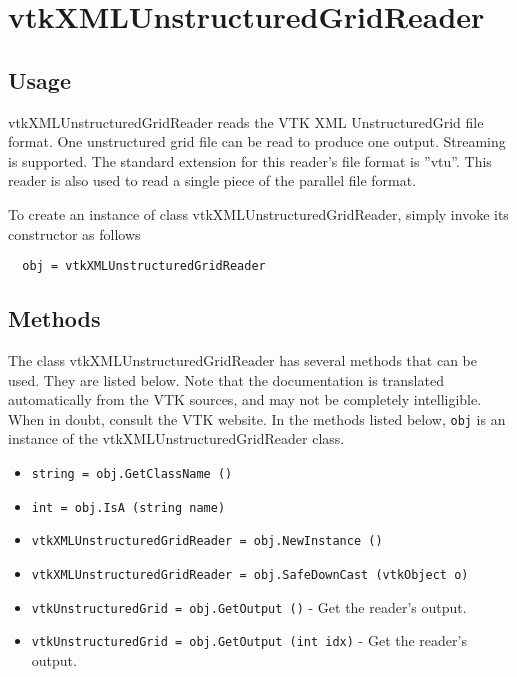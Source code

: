 \section{vtkXMLUnstructuredGridReader}

\subsection{Usage}

 vtkXMLUnstructuredGridReader reads the VTK XML UnstructuredGrid
 file format.  One unstructured grid file can be read to produce one
 output.  Streaming is supported.  The standard extension for this
 reader's file format is ''vtu''.  This reader is also used to read a
 single piece of the parallel file format.

To create an instance of class vtkXMLUnstructuredGridReader, simply
invoke its constructor as follows
\begin{verbatim}
  obj = vtkXMLUnstructuredGridReader
\end{verbatim}
\subsection{Methods}

The class vtkXMLUnstructuredGridReader has several methods that can be used.
  They are listed below.
Note that the documentation is translated automatically from the VTK sources,
and may not be completely intelligible.  When in doubt, consult the VTK website.
In the methods listed below, \verb|obj| is an instance of the vtkXMLUnstructuredGridReader class.
\begin{itemize}
\item  \verb|string = obj.GetClassName ()|

\item  \verb|int = obj.IsA (string name)|

\item  \verb|vtkXMLUnstructuredGridReader = obj.NewInstance ()|

\item  \verb|vtkXMLUnstructuredGridReader = obj.SafeDownCast (vtkObject o)|

\item  \verb|vtkUnstructuredGrid = obj.GetOutput ()| -  Get the reader's output.

\item  \verb|vtkUnstructuredGrid = obj.GetOutput (int idx)| -  Get the reader's output.

\end{itemize}
